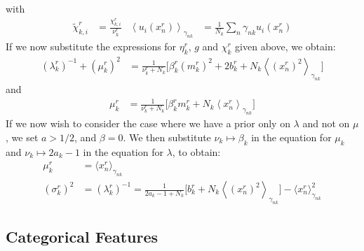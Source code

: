 \documentclass[a4paper,fleqn,10pt,openright,oldfontcommands]{memoir}
\newcommand{\ev}[1]{\left\langle #1 \right\rangle}
\begin{document}
with
\begin{align*}
      \tilde{\chi}_{k,i}^r &= \frac{\chi_{k,i}^r}{\nu_k^r } &
      \ev{u_i(x_n^r)}_{\gamma_{nk}} &=
      \frac{1}{N_k} \sum_n \gamma_{nk} u_i(x_n^r)
\end{align*}
If we now substitute the expressions for $\eta_k^r$, $g$ and $\chi_k^r$ given above, we obtain:
\begin{align*}
	  (\lambda_k^r)^{-1} + (\mu_k^r)^2 
	  & =
      \frac{1}{\nu_k^r + N_k}
      \Big[
        \beta^r_k (m^r_k)^2 + 2 b^r_k
        +
        N_k \ev{(x_n^r)^2}_{\gamma_{nk}}
      \Big]
\end{align*}
and
\begin{align*}
      \mu_k^r 
      & =
      \frac{1}{\nu_k^r + N_k}
      \Big[
        \beta_k^r m_k^r
        +
        N_k \ev{x_n^r}_{\gamma_{nk}}
      \Big]
\end{align*}
If we now wish to consider the case where we have a prior only on $\lambda$ and not on $\mu$, we
set $a > 1/2$, and $\beta = 0$. We then substitute $\nu_k \mapsto \beta_k$ in the equation for $\mu_k$ and $\nu_k \mapsto 2 a_k - 1$ in the equation for $\lambda$, to obtain:  
\begin{align*}
	\mu_k^r &= \langle x_n^r \rangle_{\gamma_{nk}} \\
	(\sigma_k^r)^2 &= (\lambda_k^r)^{-1} 
    =
    \frac{1}{2 a_k - 1 + N_k}
    \Big[
      b^r_k
      +
      N_k \ev{(x_n^r)^2}_{\gamma_{nk}}
    \Big]    
    - \langle x_n^r \rangle^2_{\gamma_{nk}}
\end{align*}


\subsection{Categorical Features}
\end{document}
